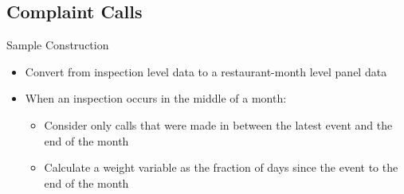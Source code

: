 \documentclass[handout]{beamer}
\begin{document}

\subsection{Complaint Calls}

\begin{frame}{Sample Construction}
\begin{itemize}
\item Convert from inspection level data to a restaurant-month level panel data
\item When an inspection occurs in the middle of a month: 
\begin{itemize}
\item Consider only calls that were made in between the latest event and the end of the month
\item Calculate a weight variable as the fraction of days since the event to the end of the month
\end{itemize}
\end{itemize}
\end{frame}
\end{document}
